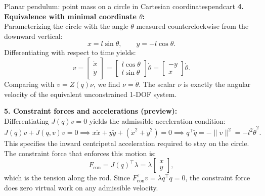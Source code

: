 \documentclass[11pt,a4paper]{article}
\begin{document}
\begin{example}{Planar pendulum: point mass on a circle in Cartesian coordinates}{pendcart}
\smallskip
\textbf{4. Equivalence with minimal coordinate $\theta$:}\\
Parameterizing the circle with the angle $\theta$ measured counterclockwise from the downward vertical:
\[
  x = l\sin\theta, \qquad y = -l\cos\theta.
\]
Differentiating with respect to time yields:
\[
  v = \begin{bmatrix} \dot x \\ \dot y \end{bmatrix} = \begin{bmatrix} l\cos\theta \\ l\sin\theta \end{bmatrix}\dot\theta = \begin{bmatrix} -y \\ x \end{bmatrix}\dot\theta.
\]
Comparing with $v = Z(q)\nu$, we find $\nu = \dot\theta$. The scalar $\nu$ is exactly the angular velocity of the equivalent unconstrained 1-DOF system.

\smallskip
\textbf{5. Constraint forces and accelerations (preview):}\\
Differentiating $J(q)v = 0$ yields the admissible acceleration condition:
\[
  J(q)\dot v + \dot J(q,v)v = 0 \implies x\ddot x + y\ddot y + (\dot x^2 + \dot y^2) = 0 \implies q^\top \ddot q = -\|v\|^2 = -l^2\dot\theta^2.
\]
This specifies the inward centripetal acceleration required to stay on the circle. The constraint force that enforces this motion is:
\[
  F_{\mathrm{con}} = J(q)^\top \lambda = \lambda \begin{bmatrix} x \\ y \end{bmatrix},
\]
which is the tension along the rod. Since $F_{\mathrm{con}}^\top v = \lambda q^\top \dot q = 0$, the constraint force does zero virtual work on any admissible velocity.

\begin{center}
\end{center}
\end{example}
\end{document}
